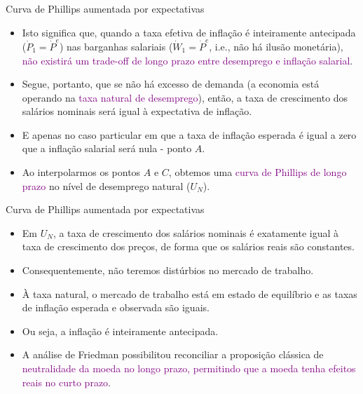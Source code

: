 \documentclass[10pt]{beamer}
\begin{document}
\begin{frame}{Curva de Phillips aumentada por expectativas}
    \begin{itemize}
        \item Isto significa que, quando a taxa efetiva de inflação é inteiramente antecipada ($\dot{P}_1=\dot{P}^e$) nas barganhas salariais ($\dot{W}_1 = \dot{P}^e$, i.e., não há ilusão monetária), \textcolor{purple}{não existirá um trade-off de longo prazo entre desemprego e inflação salarial}.
        \bigskip
        \item Segue, portanto, que se não há excesso de demanda (a economia está operando na \textcolor{purple}{taxa natural de desemprego}), então, a taxa de crescimento dos salários nominais será igual à expectativa de inflação.
        \bigskip
        \item E apenas no caso particular em que a taxa de inflação esperada é igual a zero que a inflação salarial será nula - ponto $A$.
        \bigskip
        \item Ao interpolarmos os pontos $A$ e  $C$, obtemos uma \textcolor{purple}{curva de Phillips de longo prazo} no nível de desemprego natural ($U_N$).
    \end{itemize}    
\end{frame}

\begin{frame}{Curva de Phillips aumentada por expectativas}
    \begin{itemize}
        \item Em $U_N$, a taxa de crescimento dos salários nominais é exatamente igual à taxa de crescimento dos preços, de forma que os salários reais são constantes.
        \bigskip
        \item Consequentemente, não teremos distúrbios no mercado de trabalho.
        \bigskip
        \item À taxa natural, o mercado de trabalho está em estado de equilíbrio e as taxas de inflação esperada e observada são iguais.
        \bigskip
        \item Ou seja, a inflação é inteiramente antecipada.
        \bigskip
        \item A análise de Friedman possibilitou reconciliar a proposição clássica de \textcolor{purple}{neutralidade da moeda no longo prazo, permitindo que a moeda tenha efeitos reais no curto prazo}.
    \end{itemize}    
\end{frame}
\end{document}
